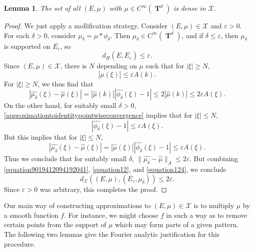 \documentclass[12pt,reqno]{article}
\numberwithin{equation}{section}
\DeclareMathOperator{\TT}{\mathbf{T}}
\newtheorem{lemma}[theorem]{Lemma}
\begin{document}
\begin{lemma} \label{smoothdensitylemma}
    The set of all $(E,\mu)$ with $\mu \in C^\infty(\TT^d)$ is dense in $\mathcal{X}$.
\end{lemma}
\begin{proof}
    We just apply a mollification strategy. Consider $(E,\mu) \in \mathcal{X}$ and $\varepsilon > 0$. For each $\delta > 0$, consider $\mu_\delta = \mu * \phi_\delta$. Then $\mu_\delta \in C^\infty(\TT^d)$, and if $\delta \leq \varepsilon$, then $\mu_\delta$ is supported on $\overline{E_\varepsilon}$, so
    \begin{equation} \label{equation9019412094192041}
        d_H(E,\overline{E_\varepsilon}) \leq \varepsilon.
    \end{equation}
    Since $(E,\mu) \in \mathcal{X}$, there is $N$ depending on $\mu$ such that for $|\xi| \geq N$,
    \[ |\widehat{\mu}(\xi)| \leq \varepsilon A(k). \]
    For $|\xi| \geq N$, we thus find that
    \begin{equation} \label{equation12}
        |\widehat{\mu_\delta}(\xi) - \widehat{\mu}(\xi)| = |\widehat{\mu}(k)||\widehat{\phi_\delta}(\xi) - 1| \leq 2 |\widehat{\mu}(k)| \leq 2\varepsilon A(\xi).
    \end{equation}
    On the other hand, for suitably small $\delta > 0$, \eqref{approximationtoidentitypointwiseconvergence} implies that for $|\xi| \leq N$,
    \[ |\widehat{\phi_\delta}(\xi) - 1| \leq \varepsilon A(\xi). \]
    But this implies that for $|\xi| \leq N$,
    \begin{equation} \label{equation124}
        |\widehat{\mu_\delta}(\xi) - \widehat{\mu}(\xi)| = |\widehat{\mu}(\xi)| |\widehat{\phi_\delta}(\xi) - 1| \leq \varepsilon A(\xi).
    \end{equation}
    Thus we conclude that for suitably small $\delta$, $\| \widehat{\mu_\delta} - \widehat{\mu} \|_A \leq 2 \varepsilon$. But combining \eqref{equation9019412094192041}, \eqref{equation12}, and \eqref{equation124}, we conclude
    \[ d_{\mathcal{X}}((E,\mu), (\overline{E_\varepsilon}, \mu_\delta)) \leq 2 \varepsilon. \]
    Since $\varepsilon > 0$ was arbitrary, this completes the proof.
\end{proof}

Our main way of constructing approximations to $(E,\mu) \in \mathcal{X}$ is to multiply $\mu$ by a smooth function $f$. For instance, we might choose $f$ in such a way as to remove certain points from the support of $\mu$ which may form parts of a given pattern. The following two lemmas give the Fourier analytic justification for this procedure.
\end{document}
